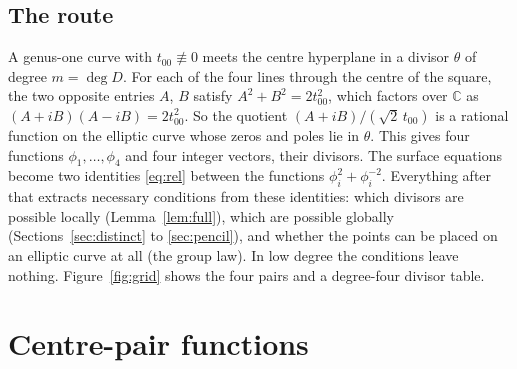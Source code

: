 \documentclass[11pt]{amsart}
\theoremstyle{definition}
\newcommand{\C}{\mathbb{C}}
\begin{document}
\subsection*{The route}
A genus-one curve with $t_{00}\not\equiv0$ meets the centre hyperplane in a divisor $\theta$ of degree $m=\deg D$.
For each of the four lines through the centre of the square, the two opposite entries $A$, $B$ satisfy
$A^2+B^2=2t_{00}^2$, which factors over $\C$ as $(A+iB)(A-iB)=2t_{00}^2$. So the quotient $(A+iB)/(\sqrt2\,t_{00})$ is
a rational function on the elliptic curve whose zeros and poles lie in $\theta$. This gives four functions
$\phi_1,\dots,\phi_4$ and four integer vectors, their divisors. The surface equations become two identities
\eqref{eq:rel} between the functions $\phi_i^2+\phi_i^{-2}$. Everything after that extracts necessary conditions from
these identities: which divisors are possible locally (Lemma~\ref{lem:full}), which are possible globally
(Sections~\ref{sec:distinct} to \ref{sec:pencil}), and whether the points can be placed on an elliptic curve at all
(the group law). In low degree the conditions leave nothing. Figure~\ref{fig:grid} shows the four pairs and a degree-four
divisor table.

\section{Centre-pair functions}\label{sec:setup}
\end{document}
